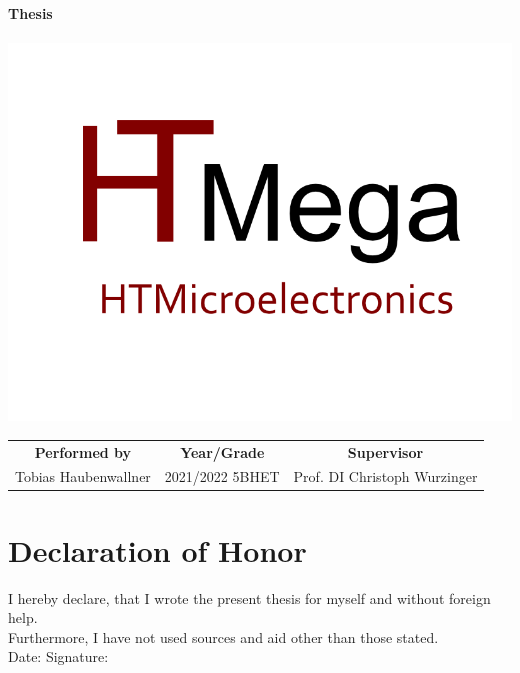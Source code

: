 \thispagestyle{fancy}
\fancyhf{}
\renewcommand{\footrulewidth}{0pt}

\vspace*{6em}
\selectfont
\begin{center}
    \begingroup
    \fontsize{60}{30}
    \textcolor{ThesisColor}{\textbf{Thesis}}\\
    \vspace{6em}
    \textbf{\Huge \ThesisName\\}
    \endgroup 
    \includegraphics[scale=0.4]{assets/logo.png}\\
    \renewcommand{\arraystretch}{2}
    \setlength{\tabcolsep}{10pt}
    \begin{tabular}{c c c}
        \textbf{Performed by} & \textbf{Year/Grade} & \textbf{Supervisor}\\
        Tobias Haubenwallner & 2021/2022 5BHET & Prof. DI Christoph Wurzinger
    \end{tabular}
\end{center}
\vspace{8.5em}
\newpage



\section*{Declaration of Honor}

I hereby declare, that I wrote the present thesis for myself and without foreign help.\\
Furthermore, I have not used sources and aid other than those stated.
\vspace{6em}\\
Date: \hspace{15em} Signature:
\newpage


